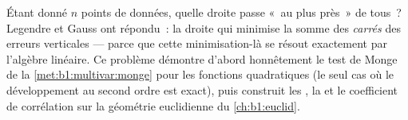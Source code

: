 \begin{problem}\label{pb:b1:multivar:1}
Étant donné $n$ points de données, quelle droite passe «~au plus
près~» de tous~? Legendre et Gauss ont répondu~: la droite qui
minimise la somme des \emph{carrés} des erreurs verticales ---
parce que cette minimisation-là se résout exactement par l'algèbre
linéaire. Ce problème démontre d'abord honnêtement le test de
Monge de la \cref{met:b1:multivar:monge} pour les fonctions
quadratiques (le seul cas où le développement au second ordre est
exact), puis construit les , la  et le coefficient de corrélation sur la géométrie
euclidienne du
\cref{ch:b1:euclid}.


\end{problem}
